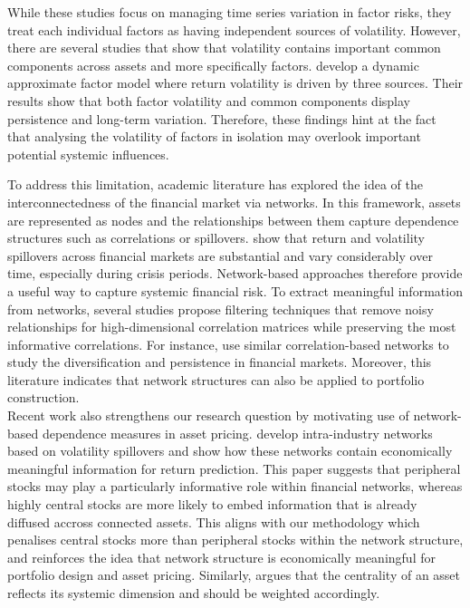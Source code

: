 \documentclass[11pt]{article}
\begin{document}
While these studies focus on managing time series variation in factor risks, they treat each individual factors as having independent sources of volatility. However, there are several studies that show that volatility contains important common components across assets and more specifically factors. \cite{ConnorKorajczykLinton2006} develop a dynamic approximate factor model where return volatility is driven by three sources. Their results show that both factor volatility and common components display persistence and long-term variation. Therefore, these findings hint at the fact that analysing the volatility of factors in isolation may overlook important potential systemic influences. 

To address this limitation, academic literature has explored the idea of the interconnectedness of the financial market via networks. In this framework, assets are represented as nodes and the relationships between them capture dependence structures such as correlations or spillovers. \cite{DieboldYilmaz2009} show that return and volatility spillovers across financial markets are substantial and vary considerably over time, especially during crisis periods. Network-based approaches therefore provide a useful way to capture systemic financial risk. To extract meaningful information from networks, several studies propose filtering techniques that remove noisy relationships for high-dimensional correlation matrices while preserving the most informative correlations. For instance, \cite{MusmeciAsteDiMatteo2014} use similar correlation-based networks to study the diversification and persistence in financial markets. Moreover, this literature indicates that network structures can also be applied to portfolio construction. \\
Recent work also strengthens our research question by motivating use of network-based dependence measures in asset pricing. \cite{MisirliScidaVelikov2025} develop intra-industry networks based on volatility spillovers and show how these networks contain economically meaningful information for return prediction. This paper suggests that peripheral stocks may play a particularly informative role within financial networks, whereas highly central stocks are more likely to embed information that is already diffused accross connected assets. This aligns with our methodology which penalises central stocks more than peripheral stocks within the network structure, and reinforces the idea that network structure is economically meaningful for portfolio design and asset pricing. Similarly, \cite{peralta2016network} argues that the centrality of an asset reflects its systemic dimension and should be weighted accordingly.
\end{document}
